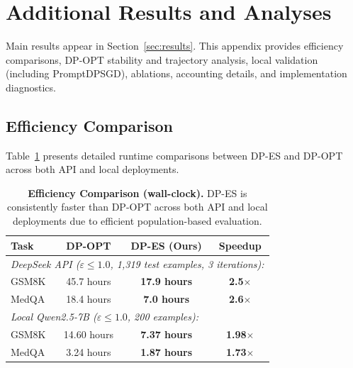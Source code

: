 \section{Additional Results and Analyses}
\label{sec:appendix:results}

\noindent Main results appear in Section~\ref{sec:results}. This appendix provides efficiency comparisons, DP-OPT stability and trajectory analysis, local validation (including PromptDPSGD), ablations, accounting details, and implementation diagnostics.

\subsection{Efficiency Comparison}
\label{sec:appendix:efficiency}

\noindent Table~\ref{tab:efficiency_full} presents detailed runtime comparisons between DP-ES and DP-OPT across both API and local deployments.

\begin{table}[t]
\centering
\small
\begin{tabular}{lccc}
\toprule
\textbf{Task} & \textbf{DP-OPT} & \textbf{DP-ES (Ours)} & \textbf{Speedup} \\
\midrule
\multicolumn{4}{l}{\textit{DeepSeek API ($\varepsilon\leq1.0$, 1,319 test examples, 3 iterations):}} \\
GSM8K & 45.7 hours & \textbf{17.9 hours} & \textbf{2.5$\times$} \\
MedQA & 18.4 hours & \textbf{7.0 hours} & \textbf{2.6$\times$} \\
\midrule
\multicolumn{4}{l}{\textit{Local Qwen2.5-7B ($\varepsilon\leq1.0$, 200 examples):}} \\
GSM8K & 14.60 hours & \textbf{7.37 hours} & \textbf{1.98$\times$} \\
MedQA & 3.24 hours & \textbf{1.87 hours} & \textbf{1.73$\times$} \\
\bottomrule
\end{tabular}
\caption{\textbf{Efficiency Comparison (wall-clock).} DP-ES is consistently faster than DP-OPT across both API and local deployments due to efficient population-based evaluation.}
\label{tab:efficiency_full}
\end{table}

